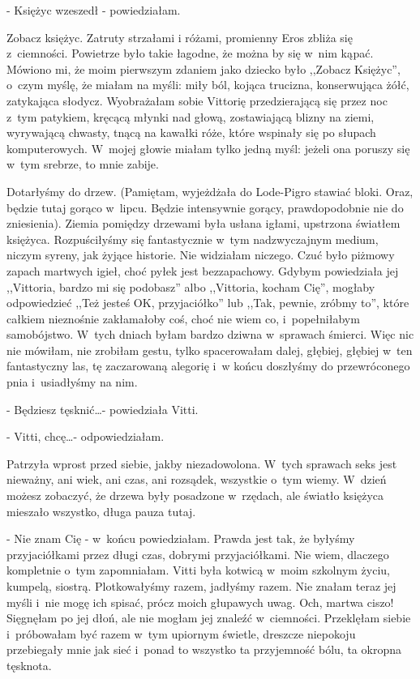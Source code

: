 \documentclass[oneside,polish,12pt,sfheadings]{mwbk}
\begin{document}
- Księżyc wzeszedł - powiedziałam. 

Zobacz księżyc. Zatruty strzałami
i różami, promienny Eros zbliża się z~ciemności. Powietrze było takie
łagodne, że można by się w~nim kąpać. Mówiono mi, że moim pierwszym
zdaniem jako dziecko było ,,Zobacz Księżyc'', o~czym myślę, że miałam
na myśli: miły ból, kojąca trucizna, konserwująca żółć, zatykająca
słodycz. Wyobrażałam sobie Vittorię przedzierającą się przez noc z~tym patykiem, kręcącą młynki nad głową, zostawiającą blizny na ziemi,
wyrywającą chwasty, tnącą na kawałki róże, które wspinały się po słupach
komputerowych. W~mojej głowie miałam tylko jedną myśl: jeżeli ona
poruszy się w~tym srebrze, to mnie zabije.

Dotarłyśmy do drzew. (Pamiętam, wyjeżdżała do Lode-Pigro stawiać bloki.
Oraz, będzie tutaj gorąco w~lipcu. Będzie intensywnie gorący, prawdopodobnie
nie do zniesienia). Ziemia pomiędzy drzewami była usłana igłami, upstrzona
światłem księżyca. Rozpuściłyśmy się fantastycznie w~tym nadzwyczajnym
medium, niczym syreny, jak żyjące historie. Nie widziałam niczego.
Czuć było piżmowy zapach martwych igieł, choć pyłek jest bezzapachowy.
Gdybym powiedziała jej ,,Vittoria, bardzo mi się podobasz'' albo ,,Vittoria,
kocham Cię'', mogłaby odpowiedzieć ,,Też jesteś OK, przyjaciółko''
lub ,,Tak, pewnie, zróbmy to'', które całkiem nieznośnie zakłamałoby
coś, choć nie wiem co, i~popełniłabym samobójstwo. W~tych dniach byłam
bardzo dziwna w~sprawach śmierci. Więc nic nie mówiłam, nie zrobiłam
gestu, tylko spacerowałam dalej, głębiej, głębiej w~ten fantastyczny
las, tę zaczarowaną alegorię i~w końcu doszłyśmy do przewróconego
pnia i~usiadłyśmy na nim. 

- Będziesz tęsknić\ldots - powiedziała Vitti.

- Vitti, chcę\ldots - odpowiedziałam.

Patrzyła wprost przed siebie, jakby niezadowolona. W~tych sprawach
seks jest nieważny, ani wiek, ani czas, ani rozsądek, wszystkie o~tym
wiemy. W~dzień możesz zobaczyć, że drzewa były posadzone w~rzędach,
ale światło księżyca mieszało wszystko, długa pauza tutaj.

- Nie znam Cię - w~końcu powiedziałam. Prawda jest tak, że byłyśmy
przyjaciółkami przez długi czas, dobrymi przyjaciółkami. Nie wiem,
dlaczego kompletnie o~tym zapomniałam. Vitti była kotwicą w~moim szkolnym
życiu, kumpelą, siostrą. Plotkowałyśmy razem, jadłyśmy razem. Nie
znałam teraz jej myśli i~nie mogę ich spisać, prócz moich głupawych
uwag. Och, martwa ciszo! Sięgnęłam po jej dłoń, ale nie mogłam jej
znaleźć w~ciemności. Przeklęłam siebie i~próbowałam być razem w~tym
upiornym świetle, dreszcze niepokoju przebiegały mnie jak sieć i~ponad
to wszystko ta przyjemność bólu, ta okropna tęsknota.
\end{document}
